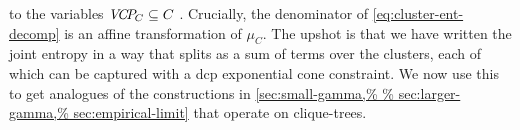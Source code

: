 to the variables $\mathit{V\mskip-5muC\mskip-3.5muP\!}_C \subseteq C$
\unskip.
%
Crucially, the denominator of \eqref{eq:cluster-ent-decomp} is an affine transformation of $\mu_C$.
The upshot is that we have written the joint entropy in a way that
splits as a sum of terms over the clusters, each of which can be captured 
with
a dcp exponential cone constraint.
We now use this to get analogues of the constructions
in \cref{sec:small-gamma,%
sec:empirical-limit} that 
operate
on clique-trees.

